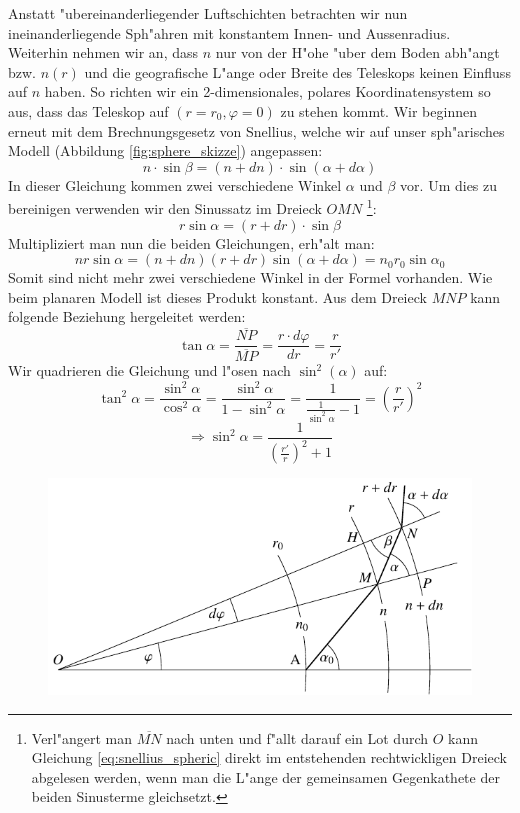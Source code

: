 \begin{refsection}
Anstatt "ubereinanderliegender Luftschichten betrachten wir nun ineinanderliegende Sph"ahren mit konstantem Innen- und Aussenradius.
Weiterhin nehmen wir an, dass $n$ nur von der H"ohe "uber dem Boden abh"angt bzw. $n(r)$ und die geografische L"ange oder Breite des Teleskops keinen Einfluss auf $n$ haben.
So richten wir ein 2-dimensionales, polares Koordinatensystem so aus, dass das Teleskop auf $(r = r_0, \varphi=0)$ zu stehen kommt.
Wir beginnen erneut mit dem Brechnungsgesetz von Snellius, welche wir auf unser sph"arisches Modell (Abbildung \ref{fig:sphere_skizze}) angepassen: 
\begin{equation} \label{eq:snellius_spheric}
n \cdot \sin \beta = (n + dn) \cdot \sin(\alpha + d\alpha)
\end{equation}
In dieser Gleichung kommen zwei verschiedene Winkel $\alpha$ und $\beta$ vor. 
Um dies zu bereinigen verwenden wir den Sinussatz im Dreieck $OMN$
\footnote{Verl"angert man $\overline{MN}$ nach unten und f"allt darauf ein Lot durch $O$ kann Gleichung \ref{eq:snellius_spheric} direkt im entstehenden rechtwickligen Dreieck abgelesen werden, wenn man die L"ange der gemeinsamen Gegenkathete der beiden Sinusterme gleichsetzt.}:
\begin{equation} \label{eq:snellius_spheric2}
r \sin\alpha = (r + dr) \cdot \sin\beta
\end{equation}
Multipliziert man nun die beiden Gleichungen, erh"alt man:
\begin{equation} \label{eq:sphere_base}
n r \sin \alpha = (n + dn)(r + dr) \sin (\alpha + d\alpha) = n_0 r_0 \sin \alpha_0
\end{equation}
Somit sind nicht mehr zwei verschiedene Winkel in der Formel vorhanden.
Wie beim planaren Modell ist dieses Produkt konstant.  
Aus dem Dreieck $MNP$ kann folgende Beziehung hergeleitet werden:
$$\tan \alpha =  \frac{\overline{NP}}{\overline{MP}} = \frac{r \cdot d\varphi}{dr} = \frac{r}{r'}$$
Wir quadrieren die Gleichung und l"osen nach $\sin^2(\alpha)$ auf:
$$\tan^2 \alpha = \frac{\sin^2\alpha}{\cos^2\alpha} = \frac{\sin^2\alpha}{1-\sin^2\alpha} = \frac{1}{\displaystyle\frac{1}{\sin^2\alpha}-1} = \left( \frac{r}{r'} \right)^2$$
\begin{equation} \label{eq:sphere_sine}
\Rightarrow \sin^2\alpha = \frac{1}{\left( \frac{r'}{r} \right)^2 +1}
\end{equation}
\begin{figure} 
\centering
\includegraphics[scale=1]{licht/standalone/fig_sphere_skizze.pdf}

\end{figure}
\end{refsection}
